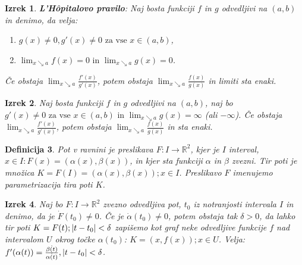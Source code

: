 \documentclass[a4paper,12pt]{report}
\newtheorem{izrek}{Izrek}[section]
\newtheorem{definicija}[izrek]{Definicija}
\begin{document}
\begin{izrek}
    \textbf{L'Hôpitalovo pravilo}: Naj bosta funkciji $f$ in $g$ odvedljivi na $(a,b)$ in denimo, da velja:
    \begin{enumerate}
        \item $g(x) \neq 0, g'(x) \neq 0 \text{ za vse } x \in (a,b)$,
        \item $\lim_{x \searrow a} f(x) = 0 \text{ in } \lim_{x \searrow a} g(x) = 0$.
    \end{enumerate} 
    Če obstaja $\lim_{x \searrow a} \frac{f'(x)}{g'(x)}$, potem obstaja $\lim_{x \searrow a} \frac{f(x)}{g(x)}$ in limiti sta enaki.
\end{izrek}

\begin{izrek}
    Naj bosta funkciji $f$ in $g$ odvedljivi na $(a,b)$, naj bo $g'(x) \neq 0 \text{ za vse } x \in (a,b) \text{ in } \lim_{x \searrow a} g(x) = \infty$ (ali $- \infty$). 
    Če obstaja $\lim_{x \searrow a} \frac{f'(x)}{g'(x)}$, potem obstaja $\lim_{x \searrow a} \frac{f(x)}{g(x)}$ in sta enaki.
\end{izrek}

\begin{definicija}
    Pot v ravnini je preslikava $F: I \to \mathbb{R}^2$, kjer je $I$ interval, $x \in I: F(x) = (\alpha(x), \beta(x))$, in kjer sta funkciji $\alpha$ in $\beta$ 
    zvezni. Tir poti je množica $K = F(I) = {(\alpha(x), \beta(x)); x \in I}$. Preslikavo $F$ imenujemo parametrizacija tira poti $K$.
\end{definicija}

\begin{izrek}
    Naj bo $F: I \to \mathbb{R}^2$ zvezno odvedljiva pot, $t_0$ iz notranjosti intervala $I$ in denimo, da je $\dot{F}(t_0) \neq 0$. Če je $\dot{\alpha}(t_0) \neq 0$, 
    potem obstaja tak $\delta > 0$, da lahko tir poti $K = {F(t); \abs{t - t_0} < \delta}$ zapišemo kot graf neke odvedljive funkcije $f$ nad intervalom $U$ 
    okrog točke $\alpha(t_0)$: $K = {(x, f(x)); x \in U}$. Velja: $f'(\alpha(t)) = \frac{\dot{\beta(t)}}{\dot{\alpha(t)}}, \abs{t - t_0} < \delta$.
\end{izrek}


\pagebreak
\end{document}
